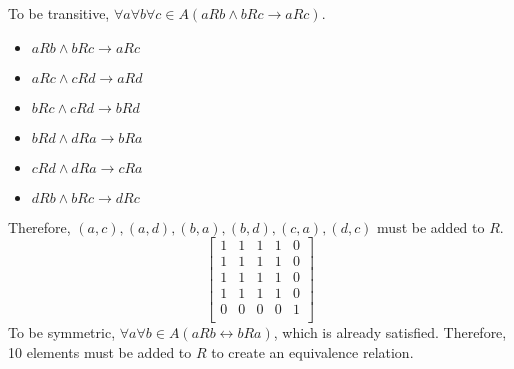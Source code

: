 \documentclass[article, 12pt]{article}
\theoremstyle{definition}
\begin{document}
    To be transitive, $\forall a \forall b \forall c \in A (aRb \land bRc \to aRc)$. 
    \begin{itemize}
        \item $aRb \land bRc \to aRc$
        \item $aRc \land cRd \to aRd$
        \item $bRc \land cRd \to bRd$
        \item $bRd \land dRa \to bRa$
        \item $cRd \land dRa \to cRa$
        \item $dRb \land bRc \to dRc$
    \end{itemize}    
    Therefore, $(a,c),(a,d),(b,a),(b,d),(c,a),(d,c)$ must be added to $R$.
    \[ \begin{bmatrix}
        1 & 1 & 1 & 1 & 0 \\
        1 & 1 & 1 & 1 & 0 \\
        1 & 1 & 1 & 1 & 0 \\
        1 & 1 & 1 & 1 & 0 \\
        0 & 0 & 0 & 0 & 1 \\
    \end{bmatrix} \]
    To be symmetric, $\forall a \forall b \in A (aRb \leftrightarrow bRa)$, which is already satisfied. Therefore, 10 elements must be added to $R$ to create an equivalence relation.
\end{document}
